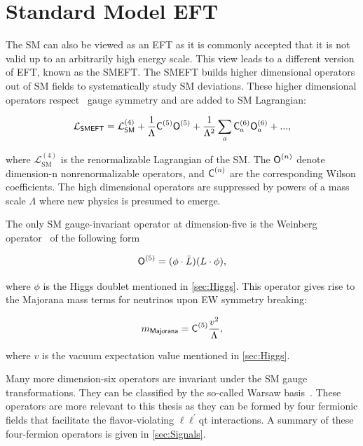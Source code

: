 \section{Standard Model EFT}
\label{sec:SMEFT}

The \ac{SM} can also be viewed as an \ac{EFT} as it is commonly accepted that it is not valid up to an arbitrarily high energy scale. This view leads to a different version of \ac{EFT}, known as the \ac{SMEFT}. The \ac{SMEFT} builds higher dimensional operators out of \ac{SM} fields to systematically study \ac{SM} deviations. These higher dimensional operators respect \sm~gauge symmetry and are added to \ac{SM} Lagrangian:

\begin{equation}
\label{eq:0}
\mathcal{L}_{\textsf{SMEFT}}=\mathcal{L}_{\textsf{SM}}^{(4)} + \frac{1}{\mathrm{\Lambda}}\textsf{C}^{(5)}_{}\textsf{O}^{(5)}_{}+ \frac{1}{\mathrm{\Lambda}^2}\sum_{a}\textsf{C}^{(6)}_{a}\textsf{O}^{(6)}_{a} + ...,
\end{equation}  

where $\mathcal{L}_{\text{SM}}^{(4)}$ is the renormalizable Lagrangian of the \ac{SM}. The $\textsf{O}^{(n)}_{}$ denote dimension-n nonrenormalizable operators, and $\textsf{C}^{(n)}_{}$ are the corresponding Wilson coefficients. The high dimensional operators are suppressed by powers of a mass scale $\Lambda$ where new physics is presumed to emerge. 

The only \ac{SM} gauge-invariant operator at dimension-five is the Weinberg operator~\cite{Weinberg:1979sa} of the following form

\begin{equation}
\textsf{O}^{(5)}_{}=(\phi\cdot\bar{L})(L\cdot\phi),
\end{equation}

where $\phi$ is the Higgs doublet mentioned in \autoref{sec:Higgs}. This operator gives rise to the Majorana mass terms for neutrinos upon \ac{EW} symmetry breaking:

\begin{equation}
m_{\textsf{Majorana}}=\textsf{C}^{(5)}_{}\frac{v^2}{\mathrm{\Lambda}},
\end{equation}

where $v$ is the vacuum expectation value mentioned in \autoref{sec:Higgs}.

Many more dimension-six operators are invariant under the \ac{SM} gauge transformations. They can be classified by the so-called Warsaw basis~\cite{Grzadkowski:2010es}. These operators are more relevant to this thesis as they can be formed by four fermionic fields that facilitate the flavor-violating $\ell\ell^{\prime}$qt interactions. A summary of these four-fermion operators is given in \autoref{sec:Signals}.